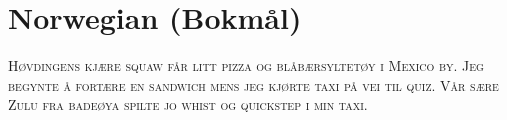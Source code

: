 

\presection\section*{\checkno Norwegian (Bokmål)}\postsection

\textsc{Høvdingens kjære squaw får litt pizza og blåbærsyltetøy i Mexico by.
Jeg begynte å fortære en sandwich mens jeg kjørte taxi på vei til quiz.
Vår sære Zulu fra badeøya spilte jo whist og quickstep i min taxi.}